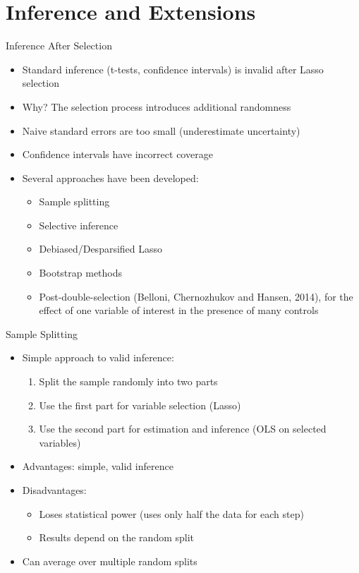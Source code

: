 \documentclass[aspectratio=169]{beamer}
\begin{document}
\section{Inference and Extensions}

\begin{frame}{Inference After Selection}
\begin{itemize}
    \item Standard inference (t-tests, confidence intervals) is invalid after Lasso selection
    \item Why? The selection process introduces additional randomness
    \item Naive standard errors are too small (underestimate uncertainty)
    \item Confidence intervals have incorrect coverage
    \item Several approaches have been developed:
    \begin{itemize}
        \item Sample splitting
        \item Selective inference
        \item Debiased/Desparsified Lasso
        \item Bootstrap methods
        \item Post-double-selection (Belloni, Chernozhukov and Hansen, 2014), for the effect of one variable of interest in the presence of many controls
    \end{itemize}
\end{itemize}
\end{frame}

\begin{frame}{Sample Splitting}
\begin{itemize}
    \item Simple approach to valid inference:
    \begin{enumerate}
        \item Split the sample randomly into two parts
        \item Use the first part for variable selection (Lasso)
        \item Use the second part for estimation and inference (OLS on selected variables)
    \end{enumerate}
    \item Advantages: simple, valid inference
    \item Disadvantages:
    \begin{itemize}
        \item Loses statistical power (uses only half the data for each step)
        \item Results depend on the random split
    \end{itemize}
    \item Can average over multiple random splits
\end{itemize}
\end{frame}
\end{document}
